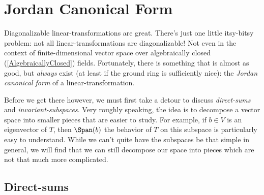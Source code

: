\section{Jordan Canonical Form}

Diagonalizable linear-transformations are great.  There's just one little itsy-bitsy problem:  not all linear-transformations are diagonalizable!  Not even in the context of finite-dimensional vector space over algebraically closed (\cref{AlgebraicallyClosed}) fields.  Fortunately, there is something that is almost as good, but \emph{always} exist (at least if the ground ring is sufficiently nice):  the \emph{Jordan canonical form} of a linear-transformation.

Before we get there however, we must first take a detour to discuss \emph{direct-sums} and \emph{invariant-subspaces}.  Very roughly speaking, the idea is to decompose a vector space into smaller pieces that are easier to study.  For example, if $b\in V$ is an eigenvector of $T$, then $\Span (b)$ the behavior of $T$ on this subspace is particularly easy to understand.  While we can't quite have the subspaces be that simple in general, we will find that we can still decompose our space into pieces which are not that much more complicated.

\subsection{Direct-sums}

